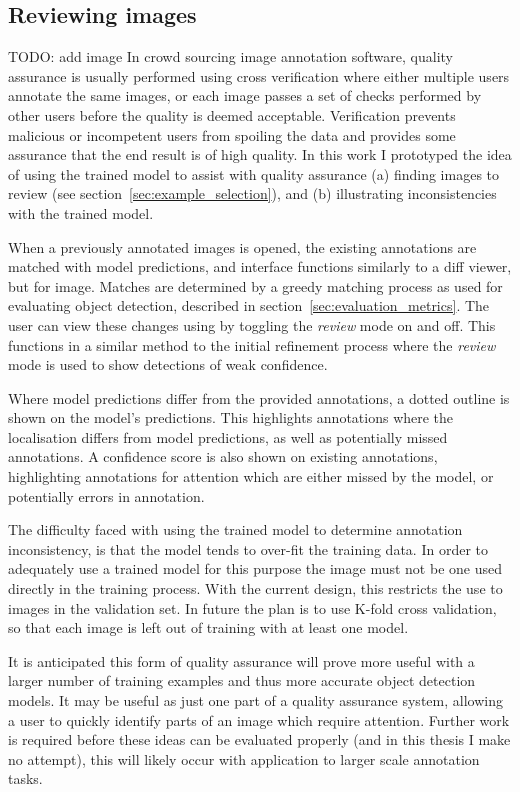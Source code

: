 \subsection{Reviewing images}
\label{sec:reviewing}
TODO: add image
In crowd sourcing image annotation software, quality assurance is usually performed using cross verification where  either multiple users annotate the same images, or each image passes a set of checks performed by other users before the quality is deemed acceptable. Verification prevents malicious or incompetent users from spoiling the data and provides some assurance that the end result is of high quality. In this work I prototyped the idea of using the trained model to assist with quality assurance (a) finding images to review (see section~\ref{sec:example_selection}), and (b) illustrating inconsistencies with the trained model.

When a previously annotated images is opened, the existing annotations are matched with model predictions, and interface functions similarly to a diff viewer, but for image. Matches are determined by a greedy matching process as used for evaluating object detection, described in section~\ref{sec:evaluation_metrics}. The user can view these changes using by toggling the \emph{review} mode on and off. This functions in a similar method to the initial refinement process where the \emph{review} mode is used to show detections of weak confidence. 

Where model predictions differ from the provided annotations, a dotted outline is shown on the model's predictions. This highlights annotations where the localisation differs from model predictions, as well as potentially missed annotations. A confidence score is also shown on existing annotations, highlighting annotations for attention which are either missed by the model, or potentially errors in annotation.

The difficulty faced with using the trained model to determine annotation inconsistency, is that the model tends to over-fit the training data. In order to adequately use a trained model for this purpose the image must not be one used directly in the training process. With the current design, this restricts the use to images in the validation set. In future the plan is to use K-fold cross validation, so that each image is left out of training with at least one model. 

It is anticipated this form of quality assurance will prove more useful with a larger number of training examples and thus more accurate object detection models. It may be useful as just one part of a quality assurance system, allowing a user to quickly identify parts of an image which require attention. Further work is required before these ideas can be evaluated properly (and in this thesis I make no attempt), this will likely occur with application to larger scale annotation tasks.

